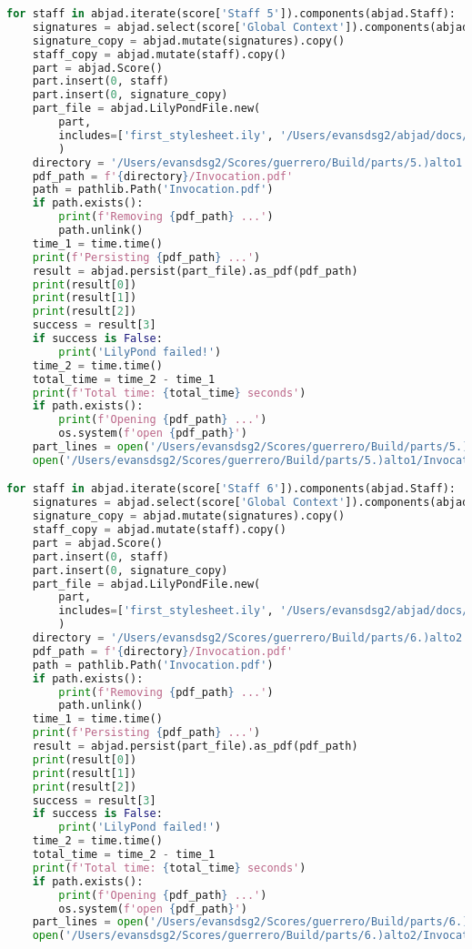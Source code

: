 \begin{lstlisting}[language=Python, caption=Invocation Source Code]
for staff in abjad.iterate(score['Staff 5']).components(abjad.Staff):
    signatures = abjad.select(score['Global Context']).components(abjad.Staff)
    signature_copy = abjad.mutate(signatures).copy()
    staff_copy = abjad.mutate(staff).copy()
    part = abjad.Score()
    part.insert(0, staff)
    part.insert(0, signature_copy)
    part_file = abjad.LilyPondFile.new(
        part,
        includes=['first_stylesheet.ily', '/Users/evansdsg2/abjad/docs/source/_stylesheets/abjad.ily'],
        )
    directory = '/Users/evansdsg2/Scores/guerrero/Build/parts/5.)alto1'
    pdf_path = f'{directory}/Invocation.pdf'
    path = pathlib.Path('Invocation.pdf')
    if path.exists():
        print(f'Removing {pdf_path} ...')
        path.unlink()
    time_1 = time.time()
    print(f'Persisting {pdf_path} ...')
    result = abjad.persist(part_file).as_pdf(pdf_path)
    print(result[0])
    print(result[1])
    print(result[2])
    success = result[3]
    if success is False:
        print('LilyPond failed!')
    time_2 = time.time()
    total_time = time_2 - time_1
    print(f'Total time: {total_time} seconds')
    if path.exists():
        print(f'Opening {pdf_path} ...')
        os.system(f'open {pdf_path}')
    part_lines = open('/Users/evansdsg2/Scores/guerrero/Build/parts/5.)alto1/Invocation.ly').readlines()
    open('/Users/evansdsg2/Scores/guerrero/Build/parts/5.)alto1/Invocation.ly', 'w').writelines(part_lines[15:-1])

for staff in abjad.iterate(score['Staff 6']).components(abjad.Staff):
    signatures = abjad.select(score['Global Context']).components(abjad.Staff)
    signature_copy = abjad.mutate(signatures).copy()
    staff_copy = abjad.mutate(staff).copy()
    part = abjad.Score()
    part.insert(0, staff)
    part.insert(0, signature_copy)
    part_file = abjad.LilyPondFile.new(
        part,
        includes=['first_stylesheet.ily', '/Users/evansdsg2/abjad/docs/source/_stylesheets/abjad.ily'],
        )
    directory = '/Users/evansdsg2/Scores/guerrero/Build/parts/6.)alto2'
    pdf_path = f'{directory}/Invocation.pdf'
    path = pathlib.Path('Invocation.pdf')
    if path.exists():
        print(f'Removing {pdf_path} ...')
        path.unlink()
    time_1 = time.time()
    print(f'Persisting {pdf_path} ...')
    result = abjad.persist(part_file).as_pdf(pdf_path)
    print(result[0])
    print(result[1])
    print(result[2])
    success = result[3]
    if success is False:
        print('LilyPond failed!')
    time_2 = time.time()
    total_time = time_2 - time_1
    print(f'Total time: {total_time} seconds')
    if path.exists():
        print(f'Opening {pdf_path} ...')
        os.system(f'open {pdf_path}')
    part_lines = open('/Users/evansdsg2/Scores/guerrero/Build/parts/6.)alto2/Invocation.ly').readlines()
    open('/Users/evansdsg2/Scores/guerrero/Build/parts/6.)alto2/Invocation.ly', 'w').writelines(part_lines[15:-1])


\end{lstlisting}
